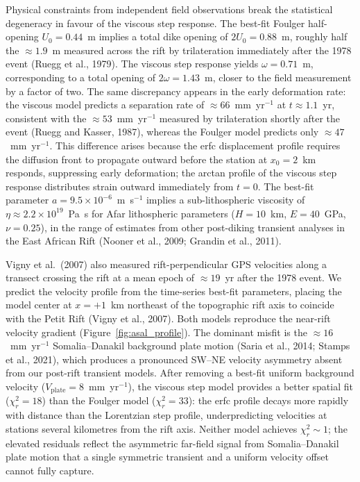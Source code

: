 \documentclass[12pt]{article}
\begin{document}
Physical constraints from independent field observations break the statistical
degeneracy in favour of the viscous step response.  The best-fit Foulger
half-opening $U_0 = 0.44$~m implies a total dike opening of $2U_0 = 0.88$~m,
roughly half the $\approx1.9$~m measured across the rift by trilateration
immediately after the 1978 event (Ruegg et al., 1979).  The viscous step response
yields $\omega = 0.71$~m, corresponding to a total opening of $2\omega = 1.43$~m,
closer to the field measurement by a factor of two.  The same discrepancy appears
in the early deformation rate: the viscous model predicts a separation rate of
$\approx66$~mm~yr$^{-1}$ at $t \approx 1.1$~yr, consistent with the
$\approx53$~mm~yr$^{-1}$ measured by trilateration shortly after the event
(Ruegg and Kasser, 1987), whereas the Foulger model predicts only
$\approx47$~mm~yr$^{-1}$.  This difference arises because the erfc displacement
profile requires the diffusion front to propagate outward before the station at
$x_0 = 2$~km responds, suppressing early deformation; the arctan profile of the
viscous step response distributes strain outward immediately from $t = 0$.  The
best-fit parameter $a = 9.5\times10^{-6}$~m~s$^{-1}$ implies a sub-lithospheric
viscosity of $\eta \approx 2.2\times10^{19}$~Pa~s for Afar lithospheric
parameters ($H = 10$~km, $E = 40$~GPa, $\nu = 0.25$), in the range of estimates
from other post-diking transient analyses in the East African Rift (Nooner et al.,
2009; Grandin et al., 2011).

Vigny et al.\ (2007) also measured rift-perpendicular GPS velocities along a
transect crossing the rift at a mean epoch of $\approx19$~yr after the 1978
event.  We predict the velocity profile from the time-series best-fit parameters,
placing the model center at $x = +1$~km northeast of the topographic rift axis to
coincide with the Petit Rift (Vigny et al., 2007).  Both models reproduce the
near-rift velocity gradient (Figure~\ref{fig:asal_profile}).  The dominant misfit
is the $\approx16$~mm~yr$^{-1}$ Somalia--Danakil background plate motion (Saria
et al., 2014; Stamps et al., 2021), which produces a pronounced SW--NE velocity
asymmetry absent from our post-rift transient models.  After removing a best-fit
uniform background velocity ($V_{\mathrm{plate}} = 8$~mm~yr$^{-1}$), the viscous
step model provides a better spatial fit ($\chi^2_r = 18$) than the Foulger model
($\chi^2_r = 33$): the erfc profile decays more rapidly with distance than the
Lorentzian step profile, underpredicting velocities at stations several kilometres
from the rift axis.  Neither model achieves $\chi^2_r \sim 1$; the elevated
residuals reflect the asymmetric far-field signal from Somalia--Danakil plate
motion that a single symmetric transient and a uniform velocity offset cannot
fully capture.
\end{document}
